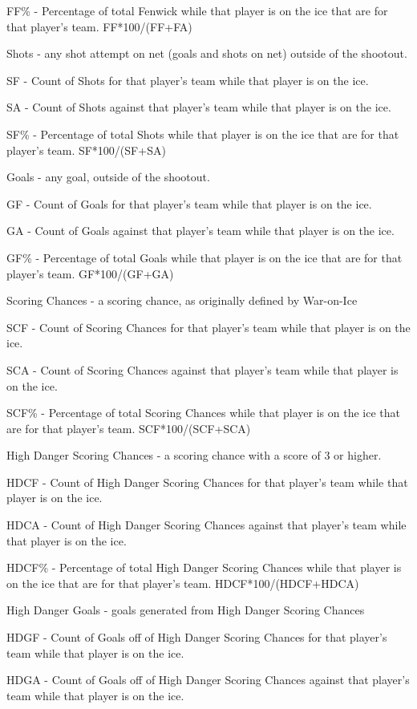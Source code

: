 \documentclass[12pt]{article}
\begin{document}
FF\% - Percentage of total Fenwick while that player is on the ice that are for that player's team. FF*100/(FF+FA)

Shots - any shot attempt on net (goals and shots on net) outside of the shootout.

SF - Count of Shots for that player's team while that player is on the ice.

SA - Count of Shots against that player's team while that player is on the ice.

SF\% - Percentage of total Shots while that player is on the ice that are for that player's team. SF*100/(SF+SA)

Goals - any goal, outside of the shootout.

GF - Count of Goals for that player's team while that player is on the ice.

GA - Count of Goals against that player's team while that player is on the ice.

GF\% - Percentage of total Goals while that player is on the ice that are for that player's team. GF*100/(GF+GA)

Scoring Chances - a scoring chance, as originally defined by War-on-Ice

SCF - Count of Scoring Chances for that player's team while that player is on the ice.

SCA - Count of Scoring Chances against that player's team while that player is on the ice.

SCF\% - Percentage of total Scoring Chances while that player is on the ice that are for that player's team. SCF*100/(SCF+SCA)

High Danger Scoring Chances - a scoring chance with a score of 3 or higher.

HDCF - Count of High Danger Scoring Chances for that player's team while that player is on the ice.

HDCA - Count of High Danger Scoring Chances against that player's team while that player is on the ice.

HDCF\% - Percentage of total High Danger Scoring Chances while that player is on the ice that are for that player's team. HDCF*100/(HDCF+HDCA)

High Danger Goals - goals generated from High Danger Scoring Chances

HDGF - Count of Goals off of High Danger Scoring Chances for that player's team while that player is on the ice.

HDGA - Count of Goals off of High Danger Scoring Chances against that player's team while that player is on the ice.
\end{document}
